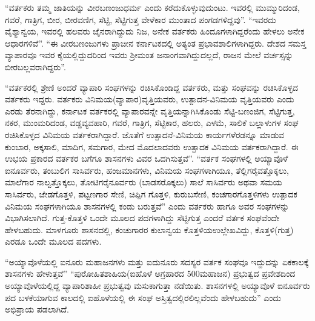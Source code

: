“ವರ್ತಕರು ತಮ್ಮ ಜಾತಿಯನ್ನು ವೀರಬಣಂಜುಧರ್ಮ ಎಂದು ಕರೆದುಕೊಳ್ಳುವುದುಂಟು. ಇವರಲ್ಲಿ ಮುಮ್ಮುರಿದಂಡ, ಗವರೆ, ಗಾತ್ರಿಗ, ಬೀರ, ಬೀರವಣಿಗ, ಸೆಟ್ಟಿ, ಸೆಟ್ಟಿಗುತ್ತ ವೇಳೆಕಾರ ಮುಂತಾದ ಪಂಗಡಗಳಿದ್ದವು”. “ಇವರದು ವೈಶ್ಯಾನ್ವಯ, ಇವರಲ್ಲಿ ಹಲವರು ಜೈನರಾಗಿದ್ದುದು ನಿಜ, ಅನೇಕ ವರ್ತಕರು ಹಿಂದೂಗಳಾಗಿದ್ದರೆಂದು ಹೇಳಲು ಅನೇಕ ಆಧಾರಗಳಿವೆ”. “ಈ ವೀರಬಣಂಜುಗಳು ಪ್ರಾಚೀನ ಕರ್ನಾಟಕದಲ್ಲಿ ಅತ್ಯಂತ ಪ್ರಭಾವಶಾಲಿಗಳಾಗಿದ್ದರು. ದೇಶದ ಸಮಸ್ತ ವ್ಯಾಪಾರವೂ ಇವರ ಕೈಯಲ್ಲಿದ್ದುದರಿಂದ ಇವರು ಶ‍್ರೀಮಂತ ಜನಾಂಗವಾಗಿದ್ದುದಲ್ಲದೆ, ರಾಜನ ಮೇಲೆ ವರ್ಚಸ್ಸನ್ನು ಬೀರಬಲ್ಲವರಾಗಿದ್ದರು”.

“ವರ್ತಕರಲ್ಲಿ ಶ್ರೇಣಿ ಅಂದರೆ ವ್ಯಾಪಾರಿ ಸಂಘಗಳನ್ನು ರಚಿಸಿಕೊಂಡಿದ್ದ ವರ್ತಕರು, ಮತ್ತು ಸಂಘವನ್ನು ರಚಿಸಿಕೊಳ್ಳದ ವರ್ತಕರು ಇದ್ದರು. ವರ್ತಕರು ವಿನಿಮಯ(ವ್ಯಾಪಾರ)ವೃತ್ತಿಯವರು, ಉತ್ಪಾದನ-ವಿನಿಮಯ ವೃತ್ತಿಯವರು ಎಂದು ಎರಡು ತೆರನಾಗಿದ್ದು, ಕರ್ನಾಟಕ ವರ್ತಕರಲ್ಲಿ ವ್ಯಾಪಾರವನ್ನೇ ವೃತ್ತಿಯನ್ನಾಗಿಸಿಕೊಂಡು ಸೆಟ್ಟಿ-ಬಣಂಜಿಗ, ಸೆಟ್ಟಿಗುತ್ತ, ನಕರ, ಮುಂಮರಿದಂಡ, ವಡ್ಡವ್ಯವಹಾರಿ, ಗವರೆ, ಗಾತ್ರಿಗ, ಸೆಟ್ಟಿಕಾರ, ಹಲರು, ಎಳಮೆ, ಸಾಲಿಕೆ ಬಲ್ಲಾಳುಗಳ ಸಂಘ ರಚಿಸಿಕೊಳ್ಳದ ವಿನಿಮಯ ವರ್ತಕರಾಗಿದ್ದಾರೆ. ಜೊತೆಗೆ ಉತ್ಪಾದನೆ-ವಿನಿಮಯ ಕಾರ್ಯಗಳೆರಡನ್ನೂ ಮಾಡುವ ಕುಂಬಾರ, ಅಕ್ಕಸಾಲಿ, ಮಾದಿಗ, ಸಮಗಾರ, ಮೇದ ಮೊದಲಾದವರು ಉತ್ಪಾದಕ ವಿನಿಮಯ ವರ್ತಕರಾಗಿದ್ದಾರೆ. ಈ ಉಭಯ ಪ್ರಕಾರದ ವರ್ತಕರ ಬಗೆಗೂ ಶಾಸನಗಳು ವಿವರ ಒದಗಿಸುತ್ತವೆ”. “ವರ್ತಕ ಸಂಘಗಳಲ್ಲಿ ಅಯ್ಯಾವೊಳೆ ಐನೂರ್ವರು, ತಂಬುಲಿಗ ಸಾಸಿರ್ವರು, ಹಂಜಮಾನಗಳು, ವಿನಿಮಯ ಸಂಘಗಳಾಗಿಯೂ, ತೆಲ್ಲಿಗರೈವತ್ತೊಕ್ಕಲು, ಮಾಲೆಗಾರ ನಾಲ್ವತ್ತೊಕ್ಕಲು, ತೋಟಿಗರೈನೂರ್ವರು (ಬಾಡಸರೊಕ್ಕಲು) ಸಾಲೆ ಸಾಸಿರ್ವರು ಅಥವಾ ಸಮಯ ಸಾಸಿರ್ವರು, ಜೇಡಗೊತ್ತಳಿ, ಪಟ್ಟಣಗಾರ ಸೇಣಿ, ಚಿಪ್ಪಿಗ ಗೊತ್ತಳಿ, ಕುರುಬಸೇಣಿ, ಕಂಚಗಾರಗೊತ್ತಳಿಗಳು ಉತ್ಪಾದಕ ವಿನಿಮಯ ಸಂಘಗಳಾಗಿಯೂ ಶಾಸನಗಳಲ್ಲಿ ಕಂಡು ಬರುತ್ತವೆ” ಎಂದು ವರ್ತಕರು ಹಾಗೂ ಅವರ ಸಂಘಗಳನ್ನು ವಿಭಾಗಿಸಲಾಗಿದೆ. ಗುತ್ತ-ಕೊತ್ತಳಿ ಒಂದೇ ಮೂಲದ ಪದಗಳಾಗಿದ್ದು ಸೆಟ್ಟಿಗುತ್ತ ಎಂದರೆ ವರ್ತಕ ಸಂಘವೆಂದೇ ಹೇಳಬಹುದು. ಮಾಳಗೂರು ಶಾಸನದಲ್ಲಿ, ಕಂಚುಗಾರರ ಕುಲಾನ್ವಯ ಕೊತ್ತಳಿಯಉಲ್ಲೇಖವಿದ್ದು, ಕೊತ್ತಳಿ(ಗುತ್ತ) ಎರಡೂ ಒಂದೇ ಮೂಲದ ಪದಗಳು.

“ಅಯ್ಯಾವೊಳೆಯಲ್ಲಿ ಐನೂರು ಮಹಾಜನಗಳು ಮತ್ತು ಐದುನೂರು  ಸದಸ್ಯರ ವರ್ತಕ ಸಂಘವೂ  ಇದ್ದುದನ್ನು ಏಕಕಾಲಕ್ಕೆ  ಶಾಸನಗಳು ಹೇಳುತ್ತವೆ” “ಪುರೋಹಿತಶಾಹಿಯ(ಐಹೊಳೆ ಅಗ್ರಹಾರದ 500ಮಹಾಜನ) ಪ್ರಭುತ್ವದ ಪ್ರವೇಶದಿಂದ ಅಯ್ಯಾವೊಳೆಯಲ್ಲಿದ್ದ ವ್ಯಾಪಾರಿಶಾಹೀ ಪ್ರಭುತ್ವವು ಮಸುಕಾಗುತ್ತಾ ನಡೆಯಿತು. ಶಾಸನಗಳಲ್ಲಿ ಅಯ್ಯಾವೊಳೆ ಐನೂರ್ವರು ಪದ ಬಳಕೆಯಾಗುವ ಕಾಲದಲ್ಲಿ ಐಹೊಳೆಯಲ್ಲಿ ಈ ಸಂಘ ಅಸ್ತಿತ್ವದಲ್ಲಿರಲಿಲ್ಲವೆಂದು ಹೇಳಬಹುದು” ಎಂದು ಅಭಿಪ್ರಾಯ ಪಡಲಾಗಿದೆ.

